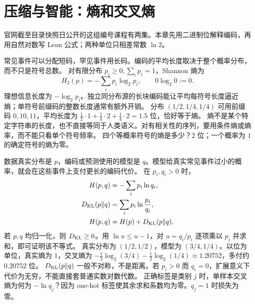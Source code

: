 \chapter{压缩与智能：熵和交叉熵}
官网截至目录快照日公开的这组编号课程有两集。本章先用二进制位解释编码，再用自然对数写 Lean 公式；两种单位只相差常数 $\ln2$。

\idea 常见事件可以分配短码，罕见事件用长码。编码的平均长度取决于整个概率分布，而不只是符号总数。
\mathpart 对有限分布 $p_i\ge0,\sum_i p_i=1$，Shannon 熵为
\[H_2(p)=-\sum_i p_i\log_2p_i,\qquad 0\log_2 0:=0.\]
理想信息长度为 $-\log_2p_i$。独立同分布源的长块编码能让平均每符号长度逼近熵；单符号前缀码的整数长度通常有额外开销。
\examplepart 分布 $(1/2,1/4,1/4)$ 可用前缀码 $0,10,11$，平均长度为 $\tfrac12\cdot1+\tfrac14\cdot2+\tfrac14\cdot2=1.5$ 位，恰好等于熵。
\pitfall 熵不是某个特定字符串的长度，也不直接等同于人类语义。对有相关性的序列，要用条件熵或熵率，而不能只看单个符号频率。
\exercise 四个等概率符号的熵是多少？$2$ 位；一个概率为 $1$ 的确定符号的熵为零。
\nextlesson

\idea 数据真实分布是 $p$，编码或预测使用的模型是 $q$。模型给真实常见事件过小的概率，就会在这些事件上支付更长的编码代价。
\mathpart 在 $p_i,q_i>0$ 时，
\begin{align*}
H(p,q)&=-\sum_i p_i\ln q_i,\\
D_{\rm KL}(p\|q)&=\sum_i p_i\ln\frac{p_i}{q_i},\\
H(p,q)&=H(p)+D_{\rm KL}(p\|q).
\end{align*}
若 $p,q$ 均归一化，则 $D_{\rm KL}\ge0$。用 $\ln u\le u-1$，对 $u=q_i/p_i$ 逐项乘以 $p_i$ 并求和，即可证明该不等式。
\examplepart 真实分布为 $(1/2,1/2)$，模型为 $(3/4,1/4)$。以位为单位，真实熵为 $1$，交叉熵为 $-\tfrac12\log_2(3/4)-\tfrac12\log_2(1/4)\approx1.20752$，多付约 $0.20752$ 位。
\pitfall $D_{\rm KL}(p\|q)$ 一般不对称，不是距离。若 $p_i>0$ 而 $q_i=0$，扩展意义下代价为无穷，不能直接套普通实数对数代数。
\exercise 正确标签是类别 $j$ 时，单样本交叉熵为何为 $-\ln q_j$？因为 one-hot 标签使其余求和系数均为零。$q_j=1$ 时损失为零。
